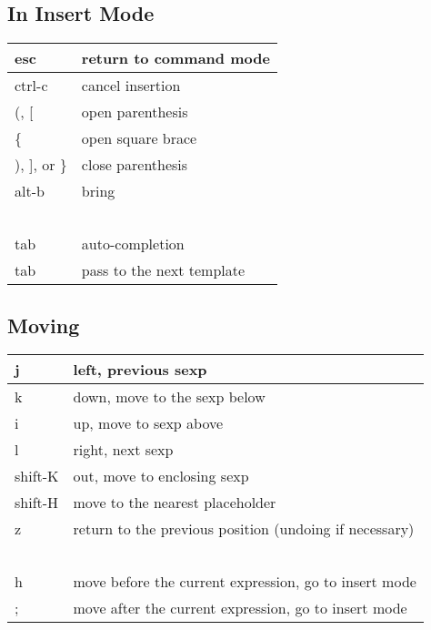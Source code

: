 \documentclass[landscape,letterpaper]{article}
\begin{document}
\begin{multicols}{2}
\subsection*{In Insert Mode}
\begin{tabular}{|l|l|} \hline
      esc       &    return to command mode \\ \hline
     ctrl-c      &   cancel insertion \\ \hline
    (, [           &  open parenthesis \\ \hline
       \{          &  open square brace \\ \hline
    ), ], or \}  &    close parenthesis \\ \hline
     alt-b       &    bring \\ \hline
        ~ & ~ \\ \hline
     tab        &    auto-completion \\ \hline
     tab       &   pass to the next template \\ \hline
\end{tabular} 

\subsection*{Moving}
\begin{tabular}{|l|l|} \hline
       j          &  left, previous sexp \\ \hline
       k            & down, move to the sexp below \\ \hline
       i            & up, move to sexp above \\ \hline
       l           & right, next sexp         \\ \hline
       shift-K   &   out, move to enclosing sexp  \\ \hline
       shift-H   &    move to the nearest placeholder \\ \hline
       z           & return to the previous position (undoing if necessary) \\ \hline
 ~ & ~ \\ \hline
       h        &    move before the current expression, go to insert mode \\ \hline
       ;         &   move after the current expression, go to insert mode \\ \hline
\end{tabular} 


\end{multicols}
\end{document}
